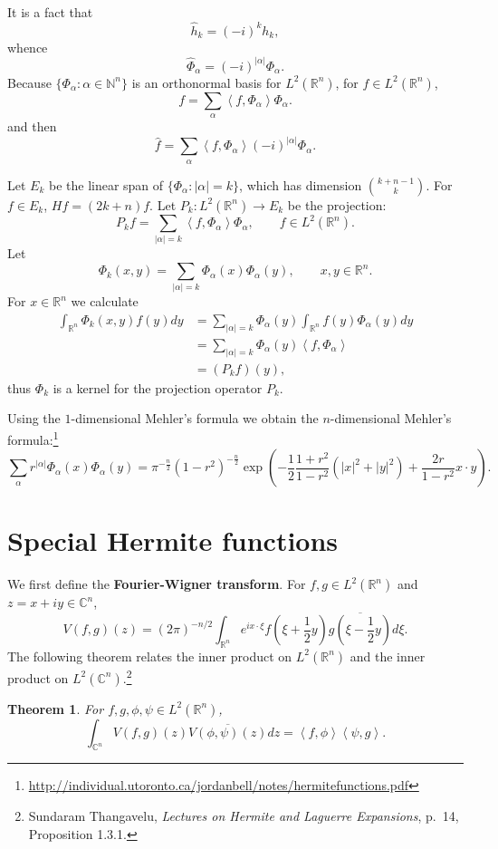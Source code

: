 \documentclass{article}
\newcommand{\inner}[2]{\left\langle #1, #2 \right\rangle}
\newtheorem{theorem}{Theorem}
\theoremstyle{definition}
\begin{document}
It is a fact that
\[
\widehat{h}_k = (-i)^k h_k,
\]
whence
\[
\widehat{\Phi}_\alpha = (-i)^{|\alpha|} \Phi_\alpha.
\]
Because $\{\Phi_\alpha: \alpha \in \mathbb{N}^n\}$ is an orthonormal basis for 
$L^2(\mathbb{R}^n)$, for $f \in L^2(\mathbb{R}^n)$, 
\[
f = \sum_{\alpha} \inner{f}{\Phi_\alpha} \Phi_\alpha.
\]
and 
then
\[
\widehat{f} = \sum_{\alpha} \inner{f}{\Phi_\alpha} (-i)^{|\alpha|} \Phi_\alpha.
\]


Let $E_k$ be the linear span of $\{\Phi_\alpha: |\alpha| = k\}$, which has dimension
$\binom{k+n-1}{k}$. 
For $f \in E_k$, $Hf = (2k+n)f$. 
Let $P_k:L^2(\mathbb{R}^n) \to E_k$ be the projection:
\[
P_k f = \sum_{|\alpha|=k} \inner{f}{\Phi_\alpha} \Phi_\alpha,
\qquad f \in L^2(\mathbb{R}^n).
\]
Let
\[
\Phi_k(x,y) = \sum_{|\alpha|=k} \Phi_\alpha(x) \Phi_\alpha(y),
\qquad x,y \in \mathbb{R}^n.
\]
For $x \in \mathbb{R}^n$ we calculate
\begin{align*}
\int_{\mathbb{R}^n} \Phi_k(x,y) f(y) dy&=
\sum_{|\alpha|=k}\Phi_\alpha(y) \int_{\mathbb{R}^n} f(y) \Phi_\alpha(y) dy\\
&=\sum_{|\alpha|=k} \Phi_\alpha(y) \inner{f}{\Phi_\alpha}\\
&=(P_k f)(y),
\end{align*}
thus $\Phi_k$ is a kernel for the projection operator $P_k$. 

Using the $1$-dimensional Mehler's formula  we obtain the $n$-dimensional
Mehler's formula:\footnote{\url{http://individual.utoronto.ca/jordanbell/notes/hermitefunctions.pdf}}
\[
\sum_{\alpha} r^{|\alpha|} \Phi_\alpha(x) \Phi_\alpha(y) = \pi^{-\frac{n}{2}} (1-r^2)^{-\frac{n}{2}} 
\exp\left(-\frac{1}{2} \frac{1+r^2}{1-r^2} (|x|^2+|y|^2)+\frac{2r}{1-r^2} x\cdot y\right).
\]



\section{Special Hermite functions}
We first define the \textbf{Fourier-Wigner transform}. For $f,g \in L^2(\mathbb{R}^n)$ and $z=x+iy \in \mathbb{C}^n$,
\[
V(f,g)(z) = (2\pi)^{-n/2} \int_{\mathbb{R}^n} e^{ix\cdot \xi} f\left(\xi+\frac{1}{2}y\right) \overline{g\left(\xi-\frac{1}{2}y\right)} d\xi.
\]
The following theorem relates the inner product on $L^2(\mathbb{R}^n)$ and the inner product on $L^2(\mathbb{C}^n)$.\footnote{Sundaram Thangavelu, {\em Lectures on Hermite and Laguerre Expansions},
p.~14, Proposition 1.3.1.}

\begin{theorem}
For $f,g,\phi,\psi \in L^2(\mathbb{R}^n)$,
\[
\int_{\mathbb{C}^n} V(f,g)(z) \overline{V(\phi,\psi)(z)} dz = \inner{f}{\phi} \inner{\psi}{g}.
\]
\end{theorem}
\end{document}
